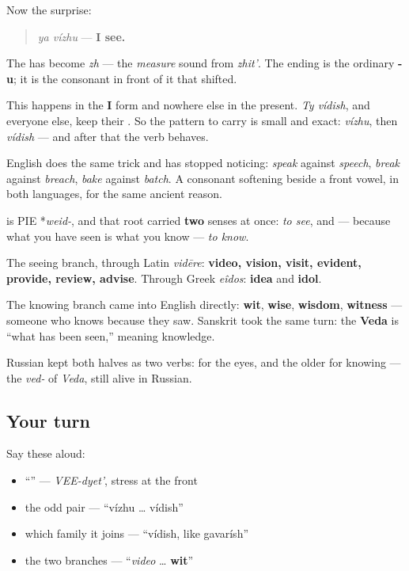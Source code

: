 \begin{grammarlens}[title={Grammar Lens: the letter that swaps for \textquotedblleft{}I\textquotedblright{}}]
Now the surprise:

\begin{quote}
\emph{ya vízhu} — \textbf{I see.}
\end{quote}

The \textbf{} has become \emph{zh} — the \emph{measure} sound from \emph{zhit'}. The ending is the ordinary \textbf{-u}; it is the consonant in front of it that shifted.

This happens in the \textbf{I} form and nowhere else in the present. \emph{Ty vídish}, and everyone else, keep their \textbf{}. So the pattern to carry is small and exact: \emph{vízhu}, then \emph{vídish} — and after that the verb behaves.

English does the same trick and has stopped noticing: \emph{speak} against \emph{speech}, \emph{break} against \emph{breach}, \emph{bake} against \emph{batch}. A consonant softening beside a front vowel, in both languages, for the same ancient reason.
\end{grammarlens}

\begin{cousinweb}
\textbf{} is PIE *\emph{weid-}, and that root carried \textbf{two} senses at once: \emph{to see}, and — because what you have seen is what you know — \emph{to know}.

The seeing branch, through Latin \emph{vidēre}: \textbf{video, vision, visit, evident, provide, review, advise}. Through Greek \emph{eîdos}: \textbf{idea} and \textbf{idol}.

The knowing branch came into English directly: \textbf{wit}, \textbf{wise}, \textbf{wisdom}, \textbf{witness} — someone who knows because they saw. Sanskrit took the same turn: the \textbf{Veda} is \textquotedblleft{}what has been seen,\textquotedblright{} meaning knowledge.

Russian kept both halves as two verbs: \textbf{} for the eyes, and the older \textbf{} for knowing — the \emph{ved-} of \emph{Veda}, still alive in Russian.
\end{cousinweb}

\subsection*{Your turn}
Say these aloud:

\begin{itemize}
\raggedright
  \item \textquotedblleft{}\textquotedblright{} — \emph{VEE-dyet'}, stress at the front
  \item the odd pair — \textquotedblleft{}vízhu … vídish\textquotedblright{}
  \item which family it joins — \textquotedblleft{}vídish, like gavarísh\textquotedblright{}
  \item the two branches — \textquotedblleft{}\emph{video} … \textbf{wit}\textquotedblright{}
\end{itemize}

